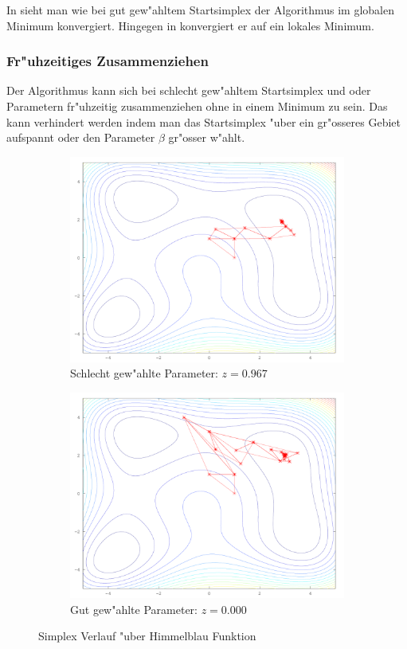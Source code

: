 In  sieht man wie bei gut gew"ahltem Startsimplex der Algorithmus im globalen Minimum konvergiert.
Hingegen in  konvergiert er auf ein lokales Minimum.


\subsubsection{Fr"uhzeitiges Zusammenziehen}
\label{sec:downhillZusammenziehen}
Der Algorithmus kann sich bei schlecht gew"ahltem Startsimplex und oder Parametern fr"uhzeitig zusammenziehen ohne in einem Minimum zu sein.
Das kann verhindert werden indem man das Startsimplex "uber ein gr"osseres Gebiet aufspannt oder den Parameter $\beta$ gr"osser w"ahlt.


\begin{figure}[htb]
\centering
\begin{subfigure}[b]{0.49\textwidth}
\centering
\includegraphics[width=\textwidth]{../bilder/HimmelblauBad/himmelblauall.png}
\caption{Schlecht gew"ahlte Parameter: $z=0.967$}
\end{subfigure} \begin{subfigure}[b]{0.49\textwidth}
\centering
\includegraphics[width=\textwidth]{../bilder/HimmelblauGood/himmelblauall.png}
\caption{Gut gew"ahlte Parameter: $z=0.000$}
\end{subfigure}

\caption{Simplex Verlauf "uber Himmelblau Funktion}
\label{fig:downhillHimmelblau}
\end{figure}
